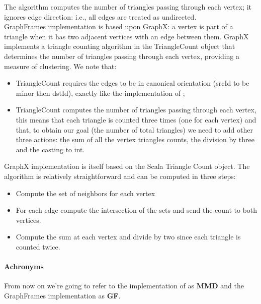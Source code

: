 \documentclass[a4paper,11pt, twoside]{article}
\begin{document}
        The algorithm computes the number of triangles passing through each vertex; it ignores edge direction: i.e., all edges are treated as undirected. \\
        GraphFrames implementation is based upon GraphX: a vertex is part of a triangle when it has two adjacent vertices with an edge between them. GraphX implements a triangle counting algorithm in the TriangleCount object that determines the number of triangles passing through each vertex, providing a measure of clustering. \cite{graphx} We note that:
        \begin{itemize}
            \item TriangleCount requires the edges to be in canonical orientation (srcId to be minor then dstId), exactly like the implementation of \cite{10.5555/2787930};
            \item TriangleCount computes the number of triangles passing through each vertex, this means that each triangle is counted three times (one for each vertex) and that, to obtain our goal (the number of total triangles) we need to add other three actions: the sum of all the vertex triangles counts, the division by three and the casting to int.
        \end{itemize}

        GraphX implementation is itself based on the Scala Triangle Count object. The algorithm is relatively straightforward and can be computed in three steps:
        \begin{itemize}
            \item Compute the set of neighbors for each vertex
            \item For each edge compute the intersection of the sets and send the count to both vertices.
            \item Compute the sum at each vertex and divide by two since each triangle is counted twice.
        \end{itemize}
 
    
        \paragraph{Achronyms}
        From now on we're going to refer to the implementation of \cite{10.5555/2787930} as \textbf{MMD} and the GraphFrames implementation as \textbf{GF}.
    
\end{document}
